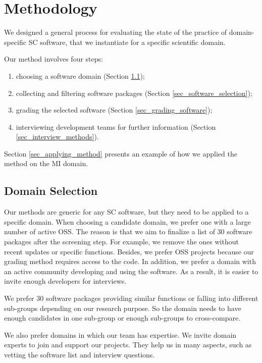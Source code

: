 \chapter{Methodology}
\label{ch_methods}

We designed a general process for evaluating the state of the practice of domain-specific SC software, that we instantiate for a specific scientific domain.

Our method involves four steps:
\begin{enumerate}
\item choosing a software domain (Section \ref{sec_domain_selection});
\item collecting and filtering software packages (Section \ref{sec_software_selection});
\item grading the selected software (Section \ref{sec_grading_software});
\item interviewing development teams for further information (Section \ref{sec_interview_methods}).
\end{enumerate}

\noindent Section \ref{sec_applying_method} presents an example of how we applied the method on the MI domain.

\section{Domain Selection}
\label{sec_domain_selection}
Our methods are generic for any SC software, but they need to be applied to a specific domain. When choosing a candidate domain, we prefer one with a large number of active OSS. The reason is that we aim to finalize a list of 30 software packages \cite{SmithEtAl2021} after the screening step. For example, we remove the ones without recent updates or specific functions. Besides, we prefer OSS projects because our grading method requires access to the code. In addition, we prefer a domain with an active community developing and using the software. As a result, it is easier to invite enough developers for interviews.

We prefer 30 software packages providing similar functions or falling into different sub-groups depending on our research purpose. So the domain needs to have enough candidates in one sub-group or enough sub-groups to cross-compare.

We also prefer domains in which our team has expertise. We invite domain experts to join and support our projects. They help us in many aspects, such as vetting the software list and interview questions.

